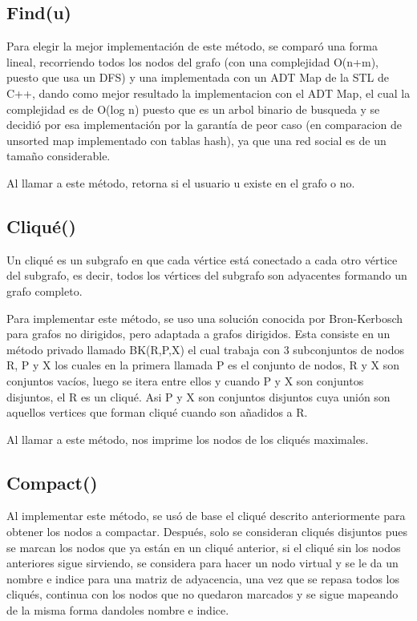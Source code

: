 \documentclass[12pt]{article}
\begin{document}
\subsection{Find(u)}

\indent \indent Para elegir la mejor implementación de este método, se comparó una forma lineal, recorriendo todos los nodos del grafo (con una complejidad O(n+m), puesto que usa un DFS) y una implementada con un ADT Map de la STL de C++, dando como mejor resultado la implementacion con el ADT Map, el cual la complejidad es de O(log n) puesto que es un arbol binario de busqueda y se decidió por esa implementación por la garantía de peor caso (en comparacion de unsorted map implementado con tablas hash), ya que una red social es de un tamaño considerable.

Al llamar a este método, retorna si el usuario u existe en el grafo o no.

\subsection{Cliqué()}

\indent\indent Un cliqué es un subgrafo en que cada vértice está conectado a cada otro vértice del subgrafo, es decir, todos los vértices del subgrafo son adyacentes formando un grafo completo.

Para implementar este método, se uso una solución conocida por Bron-Kerbosch para grafos no dirigidos, pero adaptada a grafos dirigidos. Esta consiste en un método privado llamado BK(R,P,X) el cual trabaja con 3 subconjuntos de nodos R, P y X los cuales en la primera llamada P es el conjunto de nodos, R y X son conjuntos vacíos, luego se itera entre ellos y cuando P y X son conjuntos disjuntos, el R es un cliqué. Asi P y X son conjuntos disjuntos cuya unión son aquellos vertices que forman cliqué cuando son añadidos a R.

Al llamar a este método, nos imprime los nodos de los cliqués maximales. 
\subsection{Compact()}

\indent\indent Al implementar este método, se usó de base el cliqué descrito anteriormente para obtener los nodos a compactar. Después, solo se consideran cliqués disjuntos pues se marcan los nodos que ya están en un cliqué anterior, si el cliqué sin los nodos anteriores sigue sirviendo, se considera para hacer un nodo virtual y se le da un nombre e indice para una matriz de adyacencia, una vez que se repasa todos los cliqués, continua con los nodos que no quedaron marcados y se sigue mapeando de la misma forma dandoles nombre e indice. 
\end{document}
